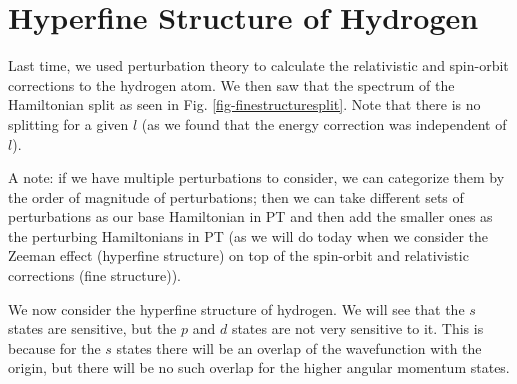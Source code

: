 \section{Hyperfine Structure of Hydrogen}
Last time, we used perturbation theory to calculate the relativistic and spin-orbit corrections to the hydrogen atom. We then saw that the spectrum of the Hamiltonian split as seen in Fig. \ref{fig-finestructuresplit}. Note that there is no splitting for a given $l$ (as we found that the energy correction was independent of $l$).

A note: if we have multiple perturbations to consider, we can categorize them by the order of magnitude of perturbations; then we can take different sets of perturbations as our base Hamiltonian in PT and then add the smaller ones as the perturbing Hamiltonians in PT (as we will do today when we consider the Zeeman effect (hyperfine structure) on top of the spin-orbit and relativistic corrections (fine structure)).

We now consider the hyperfine structure of hydrogen. We will see that the $s$ states are sensitive, but the $p$ and $d$ states are not very sensitive to it. This is because for the $s$ states there will be an overlap of the wavefunction with the origin, but there will be no such overlap for the higher angular momentum states.


